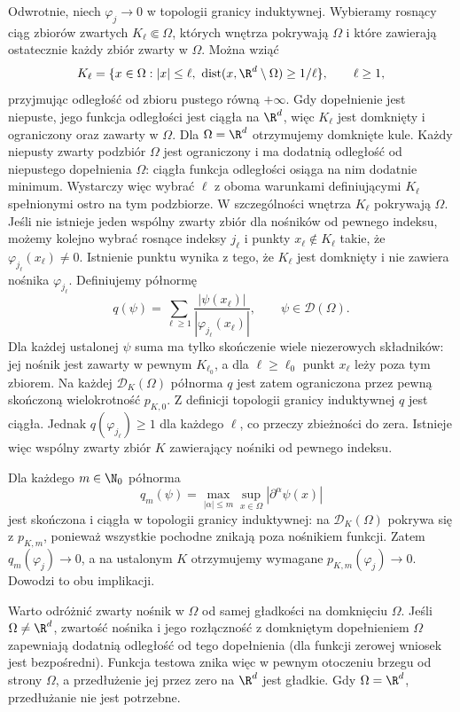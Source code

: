 Odwrotnie, niech $\varphi_j\to0$ w topologii granicy
induktywnej. Wybieramy rosnący ciąg zbiorów zwartych
$K_\ell\Subset\Omega$, których wnętrza pokrywają $\Omega$
i które zawierają ostatecznie każdy zbiór zwarty w $\Omega$.
Można wziąć
\[
 K_\ell=\{x\in\Omega:|x|\le\ell,\
 \operatorname{dist}(x,\R^d\setminus\Omega)\ge1/\ell\},
 \qquad \ell\ge1,
\]
przyjmując odległość od zbioru pustego równą $+\infty$.
Gdy dopełnienie jest niepuste, jego funkcja odległości
jest ciągła na $\R^d$, więc $K_\ell$ jest domknięty
i ograniczony oraz zawarty w $\Omega$.
Dla $\Omega=\R^d$ otrzymujemy domknięte kule.
Każdy niepusty zwarty podzbiór $\Omega$ jest ograniczony
i ma dodatnią odległość od niepustego dopełnienia
$\Omega$: ciągła funkcja odległości osiąga na nim
dodatnie minimum. Wystarczy więc wybrać $\ell$
z oboma warunkami definiującymi $K_\ell$ spełnionymi
ostro na tym podzbiorze. W szczególności wnętrza
$K_\ell$ pokrywają $\Omega$.
Jeśli nie istnieje jeden wspólny zwarty zbiór dla nośników
od pewnego indeksu, możemy kolejno wybrać rosnące indeksy
$j_\ell$ i punkty $x_\ell\notin K_\ell$ takie, że
$\varphi_{j_\ell}(x_\ell)\ne0$. Istnienie punktu wynika
z tego, że $K_\ell$ jest domknięty i nie zawiera
nośnika $\varphi_{j_\ell}$.
Definiujemy półnormę
\[
 q(\psi)=\sum_{\ell\ge1}
 \frac{|\psi(x_\ell)|}{|\varphi_{j_\ell}(x_\ell)|},
 \qquad \psi\in\mathcal D(\Omega).
\]
Dla każdej ustalonej $\psi$ suma ma tylko skończenie
wiele niezerowych składników: jej nośnik jest zawarty
w pewnym $K_{\ell_0}$, a dla $\ell\ge\ell_0$
punkt $x_\ell$ leży poza tym zbiorem. Na każdej
$\mathcal D_K(\Omega)$ półnorma $q$ jest zatem
ograniczona przez pewną skończoną wielokrotność $p_{K,0}$.
Z definicji topologii granicy induktywnej $q$ jest ciągła.
Jednak $q(\varphi_{j_\ell})\ge1$ dla każdego $\ell$,
co przeczy zbieżności do zera. Istnieje więc wspólny
zwarty zbiór $K$ zawierający nośniki od pewnego indeksu.

Dla każdego $m\in\N_0$ półnorma
\[
 q_m(\psi)=\max_{|\alpha|\le m}
 \sup_{x\in\Omega}|\partial^\alpha\psi(x)|
\]
jest skończona i ciągła w topologii granicy induktywnej:
na $\mathcal D_K(\Omega)$ pokrywa się z $p_{K,m}$,
ponieważ wszystkie pochodne znikają poza nośnikiem
funkcji. Zatem $q_m(\varphi_j)\to0$, a na ustalonym
$K$ otrzymujemy wymagane $p_{K,m}(\varphi_j)\to0$.
Dowodzi to obu implikacji.

Warto odróżnić zwarty nośnik w $\Omega$ od samej
gładkości na domknięciu $\Omega$. Jeśli $\Omega\ne\R^d$,
zwartość nośnika i jego rozłączność z domkniętym
dopełnieniem $\Omega$ zapewniają dodatnią odległość
od tego dopełnienia (dla funkcji zerowej wniosek jest
bezpośredni). Funkcja testowa znika więc w pewnym
otoczeniu brzegu od strony $\Omega$, a przedłużenie
jej przez zero na $\R^d$ jest gładkie. Gdy
$\Omega=\R^d$, przedłużanie nie jest potrzebne.

